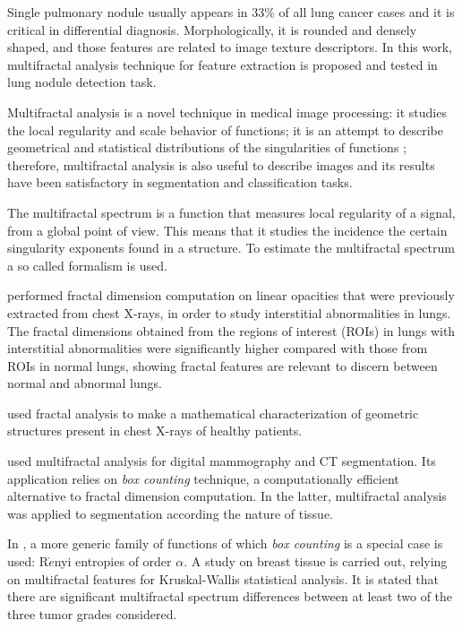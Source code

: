 \documentclass{article}
\begin{document}
Single pulmonary nodule usually appears in 33\% of all lung cancer cases and it is critical in differential diagnosis. Morphologically, it is rounded and densely shaped, and those features are related to image texture descriptors. In this work, multifractal analysis technique for feature extraction is proposed and tested in lung nodule detection task.   

Multifractal analysis is a novel technique in medical image processing: it studies the local regularity and scale behavior of functions; it is an attempt to describe geometrical and statistical distributions of the singularities of functions \citep{seuret2016multifractal}; therefore, multifractal analysis is also useful to describe images and its results have been satisfactory in segmentation and classification tasks.

The multifractal spectrum is a function that measures local regularity of a signal, from a global point of view. This means that it studies the incidence the certain singularity exponents found in a structure. To estimate the multifractal spectrum a so called formalism is used.

\citep{kido1995fractal} performed fractal dimension computation on linear opacities that were previously extracted from chest X-rays, in order to study interstitial abnormalities in lungs. The fractal dimensions obtained from the regions of interest (ROIs) in lungs with interstitial abnormalities were significantly higher compared with those from ROIs in normal lungs, showing fractal features are relevant to discern between normal and abnormal lungs. 


\citep{rodriguez2005medidas} used fractal analysis to make a mathematical characterization of geometric structures present in chest X-rays of healthy patients.

\citep{silvetti2010analisis} used multifractal analysis for digital mammography and CT segmentation. Its application relies on \textit{box counting} technique, a computationally efficient alternative to fractal dimension computation. In the latter, multifractal analysis was applied to segmentation according the nature of tissue.

In \citep{braverman2013scale}, a more generic family of functions of which \textit{box counting} is a special case is used: R$\grave{e}$nyi entropies of order $\alpha$. A study on breast tissue is carried out, relying on multifractal features for Kruskal-Wallis statistical analysis. It is stated that there are significant multifractal spectrum differences between at least two of the three tumor grades considered. 
\end{document}
